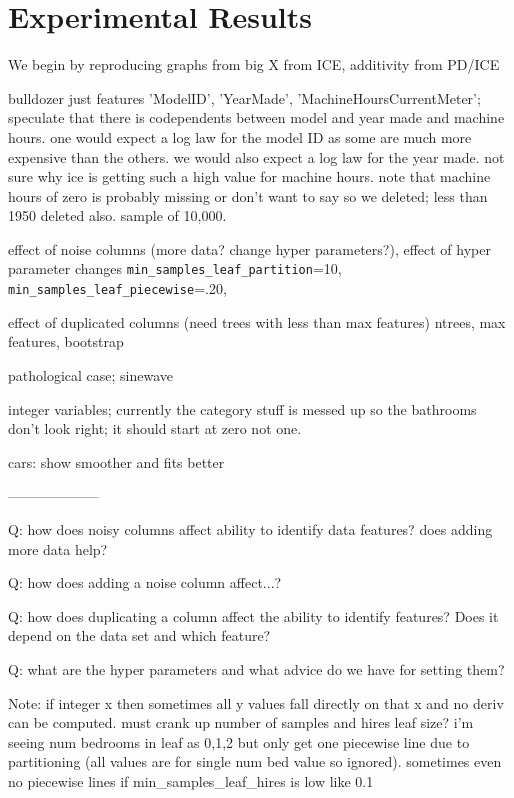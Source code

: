 \documentclass[12pt]{article}
\begin{document}

\section{Experimental Results}\label{sec:applications}

We begin by reproducing graphs from \cite{ICE} big X from ICE, additivity from PD/ICE

bulldozer  just features 'ModelID', 'YearMade', 'MachineHoursCurrentMeter'; speculate that there is codependents between model and year made and machine hours. one would expect a log law for the model ID as some are much more expensive than the others. we would also expect a log law for the year made. not sure why ice is getting such a high value for machine hours.  note that machine hours of zero is probably missing or don't want to say so we deleted; less than 1950 deleted also.  sample of 10,000.


effect of noise columns (more data? change hyper parameters?), effect of hyper parameter changes
                 {\tt min\_samples\_leaf\_partition}=10,
                 {\tt min\_samples\_leaf\_piecewise}=.20,

effect of duplicated columns (need trees with less than max features)
	ntrees, max features, bootstrap

pathological case; sinewave

integer variables; currently the category stuff is messed up so the bathrooms don't look right; it should start at zero not one.

cars: show smoother and fits better

--------------------

Q: how does noisy columns affect ability to identify data features? does adding more data help?

Q: how does adding a noise column affect...?

Q: how does duplicating a column affect the ability to identify features? Does it depend on the data set and which feature?

Q: what are the hyper parameters and what advice do we have for setting them?

Note: if integer x then sometimes all y values fall directly on that x and no deriv can be computed.  must crank up number of samples and hires leaf size? i'm seeing num bedrooms in leaf as 0,1,2 but only get one piecewise line due to partitioning (all values are for single num bed value so ignored). sometimes even no piecewise lines if min\_samples\_leaf\_hires is low like 0.1
\end{document}
